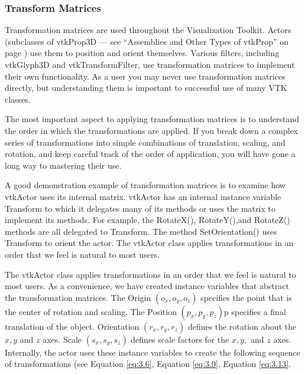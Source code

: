 \subsubsection{Transform Matrices}
\label{subsec:transform_matrices}

Transformation matrices are used throughout the  Visualization Toolkit. Actors (subclasses of vtkProp3D --- see ``Assemblies and Other Types of vtkProp'' on page \pageref{subsubsec:assemblies_vtkprop} ) use them to position and orient themselves. Various filters, including vtkGlyph3D and vtkTransformFilter, use transformation matrices to implement their own functionality. As a user you may never use transformation matrices directly, but understanding them is important to successful use of many VTK classes.

The most important aspect to applying transformation matrices is to understand the order in which the transformations are applied. If you break down a complex series of transformations into simple combinations of translation, scaling, and rotation, and keep careful track of the order of application, you will have gone a long way to mastering their use.

A good demonstration example of transformation matrices is to examine how vtkActor uses its internal matrix. vtkActor has an internal instance variable Transform to which it delegates many of its methods or uses the matrix to implement its methods. For example, the RotateX(), RotateY(),and RotateZ() methods are all delegated to Transform. The method SetOrientation() uses Transform to orient the actor. The vtkActor class applies transformations in an order that we feel is natural to most users.

The vtkActor class applies transformations in an order that we feel is natural to most users. As a convenience, we have created instance variables that abstract the transformation matrices. The Origin $(o_x,o_y,o_z)$ specifies the point that is the center of rotation and scaling. The Position $(p_x, p_y, p_z)$p specifies a final translation of the object. Orientation $(r_x, r_y, r_z)$ defines the rotation about the $x, y$ and $z$ axes. Scale $(s_x, s_y, s_z)$ defines scale factors for the $x, y,$ and $z$ axes. Internally, the actor uses these instance variables to create the following sequence of transformations (see Equation \eqref{eq:3.6}, Equation \eqref{eq:3.9},  Equation \eqref{eq:3.13}.

